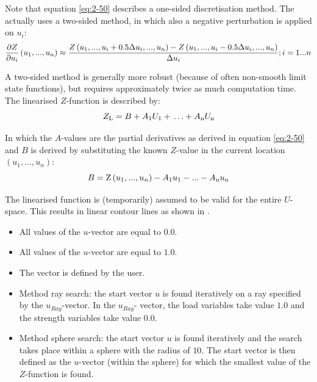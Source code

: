 Note that equation \eqref{eq:2-50} describes a one-sided discretisation method. The \probLib actually uses a two-sided method, in which also a negative perturbation is applied on $u_i$:
\begin{equation}
\frac{\partial Z}{\partial u_{i} } \left(u_{1} ,...,u_{n} \right)\approx \frac{Z\left(u_{1} ,...,u_{i} +0.5\Delta u_{i} ,...,u_{n} \right)-Z\left(u_{1} ,...,u_{i} -0.5\Delta u_{i} ,...,u_{n} \right)}{\Delta u_{i} }  \\
 ;i=1...n \label{eq:2-51}
\end{equation}

A two-sided method is generally more robust (because of often non-smooth limit state functions), but requires approximately twice as much computation time. The linearised $Z$-function is described by: 
\begin{equation}
Z_{{\rm L}} =B+A_{{\rm 1}} U_{{\rm 1}} +{\rm  }\ldots +A_{{\rm n}} U_{{\rm n}}  \label{eq:2-52} 
\end{equation}

In which the $A$-values are the partial derivatives as derived in equation \eqref{eq:2-50} and $B$ is derived by substituting the known $Z$-value in the current location $(u_1,\dots ,u_n)$: 
\begin{equation}
B={\rm Z}\left(u_{1} ,...,u_{n} \right)-A_{{\rm 1}} u_{{\rm 1}} -...-A_{{\rm n}} u_{{\rm n}}  \label{eq:2-53} 
\end{equation}

The linearised function is (temporarily) assumed to be valid for the entire $U$-space. This results in linear contour lines as shown in . 

\begin{itemize}
\item All values of the $u$-vector are equal to $0.0$.
\item All values of the $u$-vector are equal to $1.0$.
\item The vector is defined by the user.
\item Method ray search: the start vector $u$ is found iteratively on a ray specified by the $u_{Ray}$-vector. In the $u_{Ray}$-
vector, the load variables take value $1.0$ and the strength variables take value $0.0$.
\item Method sphere search: the start vector $u$ is found iteratively and the search takes place within a sphere with the
radius of $10$. The start vector is then defined as the $u$-vector (within the sphere) for which the smallest value of the $Z$-function is found.
\end{itemize}

